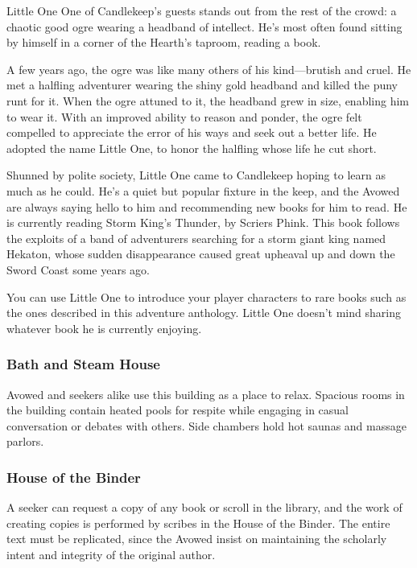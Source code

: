 \documentclass[10pt,a4paper,twoside,bg=print,twocolumn,openany,nodeprecatedcode]{dndbook}
\begin{document}
\begin{DndSidebar}[float=!b]{Little One}
One of Candlekeep's guests stands out from the rest of the crowd: a chaotic good ogre wearing a headband of intellect. He's most often found sitting by himself in a corner of the Hearth's taproom, reading a book.



A few years ago, the ogre was like many others of his kind—brutish and cruel. He met a halfling adventurer wearing the shiny gold headband and killed the puny runt for it. When the ogre attuned to it, the headband grew in size, enabling him to wear it. With an improved ability to reason and ponder, the ogre felt compelled to appreciate the error of his ways and seek out a better life. He adopted the name Little One, to honor the halfling whose life he cut short.



Shunned by polite society, Little One came to Candlekeep hoping to learn as much as he could. He's a quiet but popular fixture in the keep, and the Avowed are always saying hello to him and recommending new books for him to read. He is currently reading Storm King's Thunder, by Scriers Phink. This book follows the exploits of a band of adventurers searching for a storm giant king named Hekaton, whose sudden disappearance caused great upheaval up and down the Sword Coast some years ago.



You can use Little One to introduce your player characters to rare books such as the ones described in this adventure anthology. Little One doesn't mind sharing whatever book he is currently enjoying.



\end{DndSidebar}

\subsubsection{Bath and Steam House}
Avowed and seekers alike use this building as a place to relax. Spacious rooms in the building contain heated pools for respite while engaging in casual conversation or debates with others. Side chambers hold hot saunas and massage parlors.

\subsubsection{House of the Binder}
A seeker can request a copy of any book or scroll in the library, and the work of creating copies is performed by scribes in the House of the Binder. The entire text must be replicated, since the Avowed insist on maintaining the scholarly intent and integrity of the original author.
\end{document}
